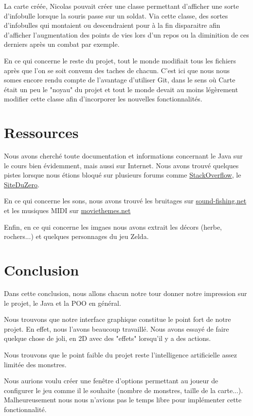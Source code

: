 \documentclass{article}
\begin{document}
La carte créée, Nicolas pouvait créer une classe permettant d'afficher une sorte d'infobulle lorsque la souris passe sur un soldat.
Via cette classe, des sortes d'infobulles qui montaient ou descendraient pour à la fin disparaitre afin d'afficher l'augmentation des points de vies lors d'un repos ou la diminition de ces derniers après un combat par exemple. 

En ce qui concerne le reste du projet, tout le monde modifiait tous les fichiers après que l'on se soit convenu des taches de chacun.
C'est ici que nous nous somes encore rendu compte de l'avantage d'utiliser Git, dans le sens où Carte était un peu le "noyau" du projet et tout le monde devait au moins légèrement modifier cette classe afin d'incorporer les nouvelles fonctionnalités.

\section{Ressources}
Nous avons cherché toute documentation et informations concernant le Java sur le cours bien évidemment, mais aussi sur Internet.
Nous avons trouvé quelques pistes lorsque nous étions bloqué sur plusieurs forums comme \href{http://stackoverflow.com}{StackOverflow}, le \href{http://siteduzero.com}{SiteDuZero}.

En ce qui concerne les sons, nous avons trouvé les bruitages sur \href{http://www.sound-fishing.net}{sound-fishing.net} et les musiques MIDI sur \href{http://moviethemes.net/lord-rings.html}{moviethemes.net}

Enfin, en ce qui concerne les imgaes nous avons extrait les décors (herbe, rochers...) et quelques personnages du jeu Zelda. %

\section{Conclusion}
Dans cette conclusion, nous allons chacun notre tour donner notre impression sur le projet, le Java et la POO en général.

Nous trouvons que notre interface graphique constitue le point fort de notre projet. En effet, nous l'avons beaucoup travaillé.
Nous avons essayé de faire quelque chose de joli, en 2D avec des "effets" lorsqu'il y a des actions.

Nous trouvons que le point faible du projet reste l'intelligence artificielle assez limitée des monstres. 

Nous aurions voulu créer une fenêtre d'options permettant au joueur de configurer le jeu comme il le souhaite (nombre de monstres, taille de la carte...).
Malheureusement nous nous n'avions pas le temps libre pour implémenter cette fonctionnalité.
\end{document}
